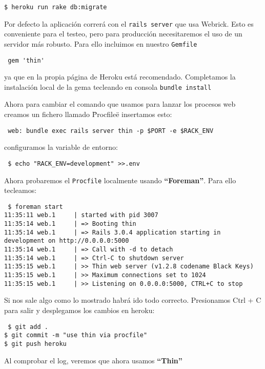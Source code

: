 \begin{verbatim}
$ heroku run rake db:migrate
\end{verbatim}

Por defecto la aplicación correrá con el \verb|rails server| que usa Webrick. Esto es conveniente para el testeo, pero para producción
necesitaremos el uso de un servidor más robusto. Para ello incluimos en nuestro \verb|Gemfile|
\begin{verbatim}
 gem 'thin'
\end{verbatim}
ya que en la propia página de Heroku está recomendado. Completamos la instalación local de la gema tecleando en consola \verb|bundle install|

Ahora para cambiar el comando que usamos para lanzar los procesos web creamos un fichero llamado \"Procfile\" e insertamos esto:
\begin{verbatim}
 web: bundle exec rails server thin -p $PORT -e $RACK_ENV
\end{verbatim}
configuramos la variable de entorno:
\begin{verbatim}
 $ echo "RACK_ENV=development" >>.env
\end{verbatim}

Ahora probaremos el \verb|Procfile| localmente usando \textbf{``Foreman''}. Para ello tecleamos:
\begin{verbatim}
 $ foreman start
11:35:11 web.1     | started with pid 3007
11:35:14 web.1     | => Booting thin
11:35:14 web.1     | => Rails 3.0.4 application starting in development on http://0.0.0.0:5000
11:35:14 web.1     | => Call with -d to detach
11:35:14 web.1     | => Ctrl-C to shutdown server
11:35:15 web.1     | >> Thin web server (v1.2.8 codename Black Keys)
11:35:15 web.1     | >> Maximum connections set to 1024
11:35:15 web.1     | >> Listening on 0.0.0.0:5000, CTRL+C to stop
\end{verbatim}
Si nos sale algo como lo mostrado habrá ido todo correcto. Presionamos Ctrl + C para salir y desplegamos los cambios en heroku:

\begin{verbatim}
 $ git add .
$ git commit -m "use thin via procfile"
$ git push heroku
\end{verbatim}

Al comprobar el log, veremos que ahora usamos \textbf{``Thin''}

